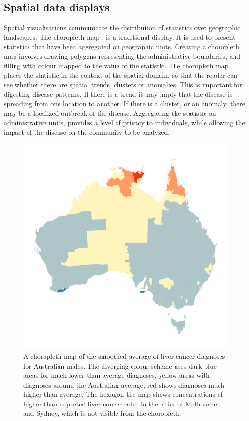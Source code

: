 \documentclass{monashthesis}
\begin{document}
\hypertarget{spatial-data-displays}{%
\subsection{Spatial data displays}\label{spatial-data-displays}}

Spatial visualisations communicate the distribution of statistics over geographic landscapes. The choropleth map \autocite{EI}, \autocite{BCM} is a traditional display. It is used to present statistics that have been aggregated on geographic units. Creating a choropleth map involves drawing polygons representing the administrative boundaries, and filling with colour mapped to the value of the statistic. The choropleth map places the statistic in the context of the spatial domain, so that the reader can see whether there are spatial trends, clusters or anomalies. This is important for digesting disease patterns. If there is a trend it may imply that the disease is spreading from one location to another. If there is a cluster, or an anomaly, there may be a localized outbreak of the disease. Aggregating the statistic on administrative units, provides a level of privacy to individuals, while allowing the impact of the disease on the community to be analyzed.

\begin{figure}[H]
\centering
\includegraphics[width=16cm]{figures/04-experiment/aus_liver_m.png}
\caption{\label{fig:liver-geo}A choropleth map of the smoothed average of liver cancer diagnoses for Australian males. The diverging colour scheme uses dark blue areas for much lower than average diagnoses, yellow areas with diagnoses around the Australian average, red shows diagnoses much higher than average. The hexagon tile map shows concentrations of higher than expected liver cancer rates in the cities of Melbourne and Sydney, which is not visible from the choropleth.}
\end{figure}
\end{document}
